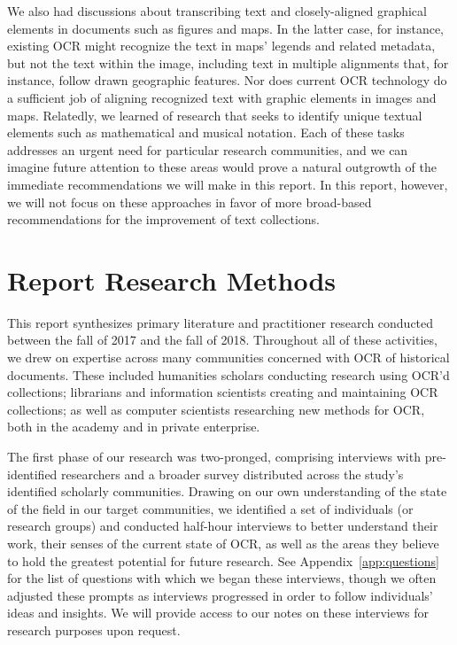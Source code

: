 \documentclass[twoside,11pt]{report}
\begin{document}
We also had discussions about transcribing text and closely-aligned graphical elements in documents such as figures and maps. In the latter case, for instance, existing OCR might recognize the text in maps' legends and related metadata, but not the text within the image, including text in multiple alignments that, for instance, follow drawn geographic features. Nor does current OCR technology do a sufficient job of aligning recognized text with graphic elements in images and maps. Relatedly, we learned of research that seeks to identify unique textual elements such as mathematical and musical notation. Each of these tasks addresses an urgent need for particular research communities, and we can imagine future attention to these areas would prove a natural outgrowth of the immediate recommendations we will make in this report. In this report, however, we will not focus on these approaches in favor of more broad-based recommendations for the improvement of text collections.

\section{Report Research Methods}

This report synthesizes primary literature and practitioner research conducted between the fall of 2017 and the fall of 2018. Throughout all of these activities, we drew on expertise across many communities concerned with OCR of historical documents. These included humanities scholars conducting research using OCR'd collections; librarians and information scientists creating and maintaining OCR collections; as well as computer scientists researching new methods for OCR, both in the academy and in private enterprise.

The first phase of our research was two-pronged, comprising interviews with pre-identified researchers and a broader survey distributed across the study's identified scholarly communities. Drawing on our own understanding of the state of the field in our target communities, we identified a set of individuals (or research groups) and conducted half-hour interviews to better understand their work, their senses of the current state of OCR, as well as the areas they believe to hold the greatest potential for future research. See Appendix~\ref{app:questions} for the list of questions with which we began these interviews, though we often adjusted these prompts as interviews progressed in order to follow individuals' ideas and insights. We will provide access to our notes on these interviews for research purposes upon request.
\end{document}
